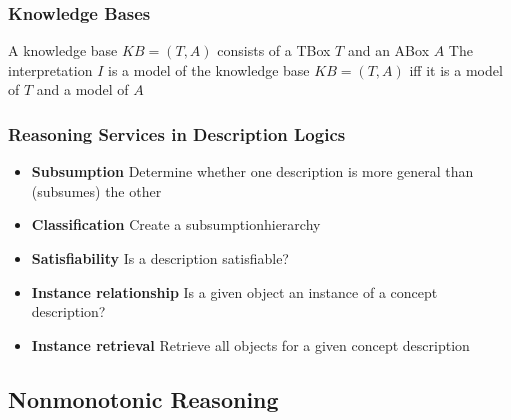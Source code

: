 \documentclass[conference]{styles/acmsiggraph}
\begin{document}
        \subsubsection{Knowledge Bases}
            A knowledge base $KB = (T,A)$ consists of a TBox $T$ and an ABox $A$\newline
            The interpretation $I$ is a model of the knowledge base $KB = (T,A)$ iff it is a model of $T$ and a model of $A$
            
        \subsubsection{Reasoning Services in Description Logics}
            \begin{itemize}
                \item \textbf{Subsumption}\newline
                    Determine whether one description is more general than (subsumes) the other
                \item \textbf{Classification}\newline
                    Create a subsumptionhierarchy
                \item \textbf{Satisfiability}\newline
                    Is a description satisfiable?
                \item \textbf{Instance relationship}\newline
                    Is a given object an instance of a concept description?
                \item \textbf{Instance retrieval}\newline
                    Retrieve all objects for a given concept description
            \end{itemize}
        
    
    
    
    
    
    
    
    \subsection{Nonmonotonic Reasoning}
\end{document}
